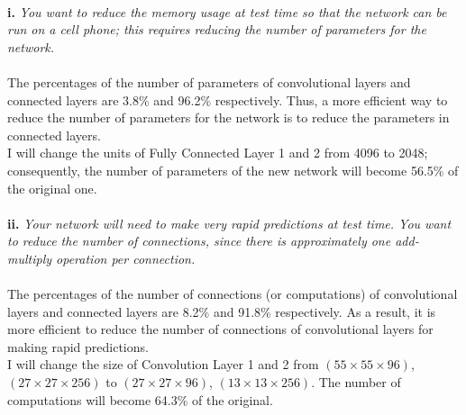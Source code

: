 \documentclass{myhw}
\begin{document}
\begin{homeworkProblem}
\begin{homeworkSection}
\\
\textbf{i.} \emph{You want to reduce the memory usage at test time so that the network can be run on a cell phone; this requires reducing the number of parameters for the network.} \\
\\ %
The percentages of the number of parameters of convolutional layers and connected layers are 3.8\% and 96.2\% respectively. Thus, a more efficient way to reduce the number of parameters for the network is to reduce the parameters in connected layers. \\
I will change the units of Fully Connected Layer 1 and 2 from 4096 to 2048; consequently, the number of parameters of the new network will become 56.5\% of the original one.
\\
\\
\textbf{ii.} \emph{Your network will need to make very rapid predictions at test time. You want to reduce the number of connections, since there is approximately one add-multiply operation per connection.} \\
\\ %
The percentages of the number of connections (or computations) of convolutional layers and connected layers are 8.2\% and 91.8\% respectively. As a result, it is more efficient to reduce the number of connections of convolutional layers for making rapid predictions. \\
I will change the size of Convolution Layer 1 and 2 from $(55\times55\times96)$, $(27\times27\times256)$ to $(27\times27\times96)$, $(13\times13\times256)$. The number of computations will become 64.3\% of the original.
\end{homeworkSection}
\end{homeworkProblem}
\end{document}
